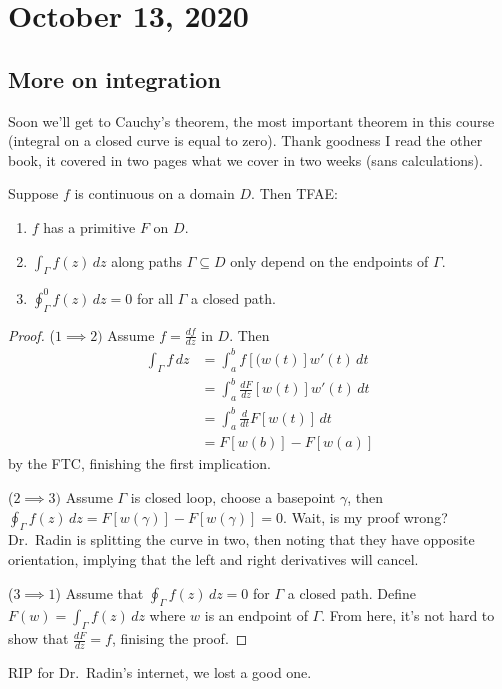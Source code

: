 \section{October 13, 2020}
\subsection{More on integration}
Soon we'll get to Cauchy's theorem, the most important theorem in this course (integral on a closed curve is equal to zero). Thank goodness I read the other book, it covered in two pages what we cover in two weeks (sans calculations).
\begin{theorem}
   Suppose $f$ is continuous on a domain $D$. Then TFAE:
   \begin{enumerate}
       \item $f$ has a primitive $F$ on $D$.
       \item $\int_{\Gamma }^{} f(z) \, dz$ along paths $\Gamma \subseteq D$ only depend on the endpoints of $\Gamma $.
       \item $\oint_{\Gamma }^{0} f(z) \, dz=0$ for all $\Gamma$ a closed path.
   \end{enumerate}
\end{theorem}
\begin{proof}
    ($1\implies 2) $ Assume $f=\frac{df}{dz}$ in $D$. Then
    \begin{align*}
        \int_{\Gamma }^{} f \, dz&=\int_{a}^{b} f[(w(t)]w'(t) \, dt\\
                                 &=\int_{a}^{b} \frac{dF}{dz}[w(t)]w'(t) \, dt\\
                                 &=\int_{a}^{b} \frac{d}{dt}F[w(t)] \, dt\\
                                 &=F[w(b)]-F[w(a)]
    \end{align*} by the FTC, finishing the first implication.

    ($2\implies 3)$ Assume $\Gamma $ is closed loop, choose a basepoint $\gamma$, then $\oint_{\Gamma }f(z)\,dz=F[w(\gamma)]-F[w(\gamma)]=0$. Wait, is my proof wrong? Dr.\ Radin is splitting the curve in two, then noting that they have opposite orientation, implying that the left and right derivatives will cancel.

    ($3\implies 1$) Assume that $\oint_{\Gamma }f(z)\,dz=0$ for $\Gamma $ a closed path. Define $F(w)=\int_{\Gamma }^{} f(z) \, dz$ where $w$ is an endpoint of $\Gamma $. From here, it's not hard to show that $\frac{dF}{dz}=f$, finising the proof.
\end{proof}
RIP for Dr.\ Radin's internet, we lost a good one.

